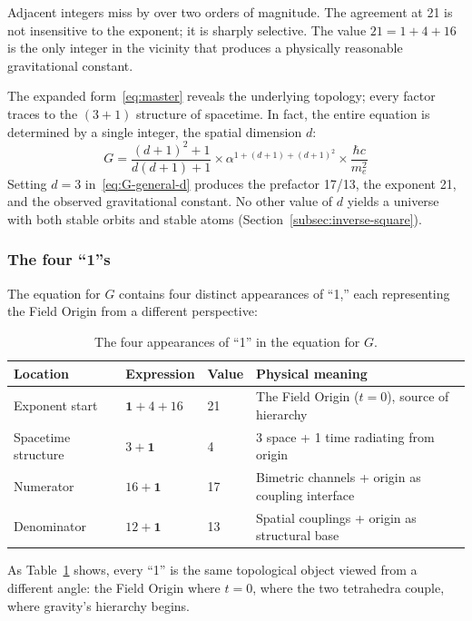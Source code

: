 \documentclass[aps,prd,preprint,superscriptaddress,showpacs,preprintnumbers,amsmath,amssymb,nofootinbib]{revtex4-2}
\begin{document}
Adjacent integers miss by over two orders of magnitude. The agreement at 21 is not insensitive to the exponent; it is sharply selective. The value $21 = 1 + 4 + 16$ is the only integer in the vicinity that produces a physically reasonable gravitational constant.

The expanded form~\eqref{eq:master} reveals the underlying topology; every factor traces to the $(3+1)$ structure of spacetime. In fact, the entire equation is determined by a single integer, the spatial dimension $d$:
\begin{equation}
G = \frac{(d+1)^2 + 1}{d(d+1) + 1} \times \alpha^{1 + (d+1) + (d+1)^2} \times \frac{\hbar c}{m_e^2}
\label{eq:G-general-d}
\end{equation}
Setting $d = 3$ in~\eqref{eq:G-general-d} produces the prefactor 17/13, the exponent 21, and the observed gravitational constant. No other value of $d$ yields a universe with both stable orbits and stable atoms (Section~\ref{subsec:inverse-square}).

\subsubsection*{The four ``1''s}

The equation for $G$ contains four distinct appearances of ``1,'' each representing the Field Origin from a different perspective:

\begin{table}[H]
\centering
\begin{tabular*}{\textwidth}{@{\extracolsep{\fill}} llll @{}}
\toprule
\textbf{Location} & \textbf{Expression} & \textbf{Value} & \textbf{Physical meaning} \\
\midrule
Exponent start & $\mathbf{1} + 4 + 16$ & 21 & The Field Origin ($t = 0$), source of hierarchy \\
Spacetime structure & $3 + \mathbf{1}$ & 4 & 3 space + 1 time radiating from origin \\
Numerator & $16 + \mathbf{1}$ & 17 & Bimetric channels + origin as coupling interface \\
Denominator & $12 + \mathbf{1}$ & 13 & Spatial couplings + origin as structural base \\
\bottomrule
\end{tabular*}
\caption{The four appearances of ``1'' in the equation for $G$.}
\label{tab:ones}
\end{table}

As Table~\ref{tab:ones} shows, every ``1'' is the same topological object viewed from a different angle: the Field Origin where $t = 0$, where the two tetrahedra couple, where gravity's hierarchy begins.
\end{document}
